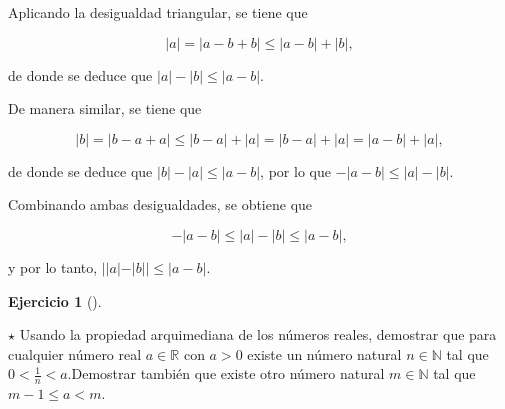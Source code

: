 \documentclass[
  spanish,
  a4paper,
]{scrreport}
\theoremstyle{definition}
\newtheorem{exercise}{Ejercicio}[chapter]
\theoremstyle{remark}
\begin{document}
\begin{tcolorbox}[enhanced jigsaw, arc=.35mm, bottomrule=.15mm, bottomtitle=1mm, breakable, colback=white, colbacktitle=quarto-callout-tip-color!10!white, colframe=quarto-callout-tip-color-frame, coltitle=black, left=2mm, leftrule=.75mm, opacityback=0, opacitybacktitle=0.6, rightrule=.15mm, title=\textcolor{quarto-callout-tip-color}{\faLightbulb}\hspace{0.5em}{Solución}, titlerule=0mm, toprule=.15mm, toptitle=1mm]

Aplicando la desigualdad triangular, se tiene que

\[|a|=|a-b+b|\leq |a-b|+|b|,\]

de donde se deduce que \(|a|-|b|\leq |a-b|\).

De manera similar, se tiene que

\[|b|=|b-a+a|\leq |b-a|+|a|=|b-a|+|a| = |a-b|+|a|,\]

de donde se deduce que \(|b|-|a|\leq |a-b|\), por lo que
\(-|a-b|\leq |a|-|b|\).

Combinando ambas desigualdades, se obtiene que

\[-|a-b|\leq |a|-|b|\leq |a-b|,\]

y por lo tanto, \(||a|-|b||\leq |a-b|\).

\end{tcolorbox}

\begin{exercise}[]\protect\hypertarget{exr-propiedad-arquimediana-1}{}\label{exr-propiedad-arquimediana-1}

\(\star\) Usando la propiedad arquimediana de los números reales,
demostrar que para cualquier número real \(a\in\mathbb{R}\) con \(a>0\)
existe un número natural \(n\in \mathbb{N}\) tal que
\(0<\frac{1}{n}<a\).Demostrar también que existe otro número natural
\(m\in \mathbb{N}\) tal que \(m-1\leq a< m\).

\end{exercise}
\end{document}

